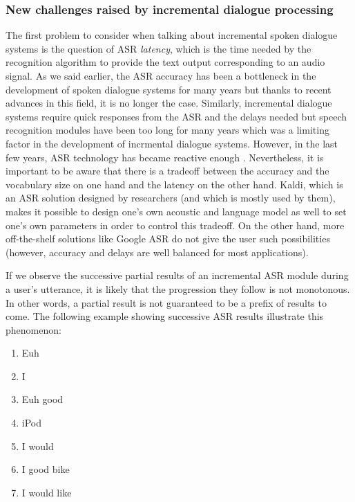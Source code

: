             \subsubsection{New challenges raised by incremental dialogue processing}
    
                The first problem to consider when talking about incremental spoken dialogue systems is the question of ASR \textit{latency}, which is the time needed by the recognition algorithm to provide the text output corresponding to an audio signal. As we said earlier, the ASR accuracy has been a bottleneck in the development of spoken dialogue systems for many years but thanks to recent advances in this field, it is no longer the case. Similarly, incremental dialogue systems require quick responses from the ASR and the delays needed but speech recognition modules have been too long for many years which was a limiting factor in the development of incrmental dialogue systems. However, in the last few years, ASR technology has became reactive enough \cite{Platek2014}. Nevertheless, it is important to be aware that there is a tradeoff between the accuracy and the vocabulary size on one hand and the latency on the other hand. Kaldi, which is an ASR solution designed by researchers (and which is mostly used by them), makes it possible to design one's own acoustic and language model as well to set one's own parameters in order to control this tradeoff. On the other hand, more off-the-shelf solutions like Google ASR do not give the user such possibilities (however, accuracy and delays are well balanced for most applications).

                If we observe the successive partial results of an incremental ASR module during a user's utterance, it is likely that the progression they follow is not monotonous. In other words, a partial result is not guaranteed to be a prefix of results to come. The following example showing successive ASR results illustrate this phenomenon:

                \begin{enumerate}
                  \item Euh
                  \item I
                  \item Euh good
                  \item iPod
                  \item I would
                  \item I good bike
                  \item I would like
                \end{enumerate}

